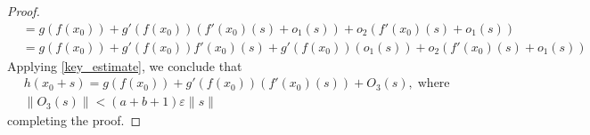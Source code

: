 \documentclass[12pt,reqno]{amsart}
\numberwithin{equation}{section}  %
\numberwithin{figure}{section}
\newcommand{\ee}{\varepsilon}
\theoremstyle{plain}
\theoremstyle{definition}
\theoremstyle{remark}
\begin{document}
\begin{proof}
\begin{equation*}
\begin{split}
					&= g(f(x_0)) + g'(f(x_0))(f'(x_0)(s) + o_{1}(s)) 
					+ o_{2}(f'(x_0)(s) + o_{1}(s))
					\\
					&= g(f(x_0)) + g'(f(x_0))f'(x_0)(s) +
					g'(f(x_0))(o_{1}(s)) + o_{2}(f'(x_0)(s) + o_{1}(s))
				\end{split}
			\end{equation*}
			Applying \eqref{key_estimate}, we conclude that
			\begin{equation*}
				\begin{split}
				&h(x_0 + s) = g(f(x_0)) + g'(f(x_0))(f'(x_0)(s)) +
				O_3(s), \; 
			\text{where}
				\\
				&\|O_3(s)\| < (a + b + 1) \ee \|s\|
			\end{split}
			\end{equation*}
     completing the proof. 
   \end{proof}
%
%
%
%
%
%
%
%
%
\end{document}
